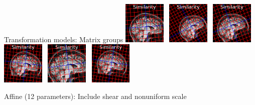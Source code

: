 \documentclass{beamer}
\begin{document}
\begin{frame}{Transformation models: Matrix groups}
\includegraphics[width=0.15\textwidth]{tform_models_similarity_1}~
\includegraphics[width=0.15\textwidth]{tform_models_similarity_2}~
\includegraphics[width=0.15\textwidth]{tform_models_similarity_3}~
\includegraphics[width=0.15\textwidth]{tform_models_similarity_4}~
\includegraphics[width=0.15\textwidth]{tform_models_similarity_5}~
\includegraphics[width=0.15\textwidth]{tform_models_similarity_6}


Affine (12 parameters): Include shear and nonuniform scale



\end{frame}
\end{document}
